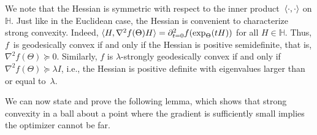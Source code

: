 \documentclass[aos]{imsart}
\theoremstyle{definition}
\numberwithin{equation}{section}
\renewcommand{\H}{{\mathbb{H}}}
\begin{document}
We note that the Hessian is symmetric with respect to the inner product~$\braket{\cdot,\cdot}$ on $\H$.
Just like in the Euclidean case, the Hessian is convenient to characterize strong convexity.
Indeed, $\braket{H, \nabla^2 f(\Theta) H} = \partial^2_{t=0} f(\exp_{\Theta}(tH))$ for all $H\in \H$.
Thus, $f$~is geodesically convex if and only if the Hessian is positive semidefinite, that is, $\nabla^2 f(\Theta) \succeq 0$. %
Similarly, $f$ is $\lambda$-strongly geodesically convex if and only if~$\nabla^2 f(\Theta) \succeq \lambda I$, i.e., the Hessian is positive definite with eigenvalues larger than or equal to~$\lambda$.

We can now state and prove the following lemma, which shows that strong convexity in a ball about a point where the gradient is sufficiently small implies the optimizer cannot be far.
\end{document}
